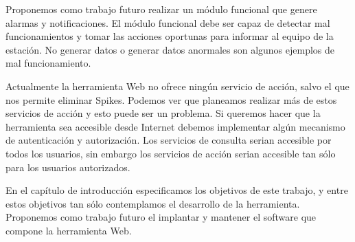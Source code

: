 \begin{description}[style=unboxed,leftmargin=0cm,labelwidth=1cm]
				Proponemos como trabajo futuro realizar un módulo funcional que genere alarmas y notificaciones.  El módulo funcional
				debe ser capaz de detectar mal funcionamientos y tomar las acciones oportunas para informar al equipo de la estación.
				No generar datos o generar datos anormales son algunos ejemplos de mal funcionamiento.
			\item[Autenticación y autorización]
				Actualmente la herramienta Web no ofrece ningún servicio de acción, salvo el que nos permite eliminar Spikes. Podemos
				ver que planeamos realizar más de estos servicios de acción y esto puede ser un problema. Si queremos hacer que la
				herramienta sea accesible desde Internet debemos implementar algún mecanismo de autenticación y autorización. Los
				servicios de consulta serian accesible por todos los usuarios, sin embargo los servicios de acción serian accesible
				tan sólo para los usuarios autorizados.
			\item[Implantación y Mantenimiento]
				En el capítulo de introducción especificamos los objetivos de este trabajo, y entre estos objetivos tan sólo
				contemplamos el desarrollo de la herramienta. Proponemos como trabajo futuro el implantar y mantener el software que
				compone la herramienta Web. 
		\end{description}
